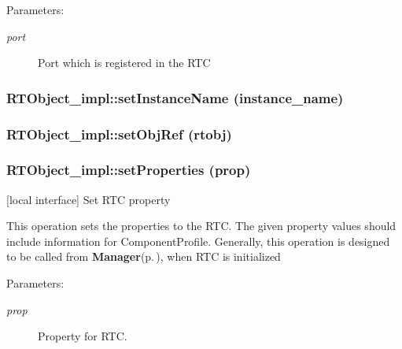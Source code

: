\begin{Desc}
\item[Parameters:]
\begin{description}
\item[{\em port}]Port which is registered in the RTC\end{description}
\end{Desc}
\subsubsection{\setlength{\rightskip}{0pt plus 5cm}RTObject\_\-impl::set\-Instance\-Name (instance\_\-name)}\label{classRTObject__impl_RTObject__impla49}


\subsubsection{\setlength{\rightskip}{0pt plus 5cm}RTObject\_\-impl::set\-Obj\-Ref (rtobj)}\label{classRTObject__impl_RTObject__impla56}


\subsubsection{\setlength{\rightskip}{0pt plus 5cm}RTObject\_\-impl::set\-Properties (prop)}\label{classRTObject__impl_RTObject__impla58}


[local interface] Set RTC property 

This operation sets the properties to the RTC. The given property values should include information for Component\-Profile. Generally, this operation is designed to be called from {\bf Manager}{\rm (p.\,\pageref{classManager})}, when RTC is initialized

\begin{Desc}
\item[Parameters:]
\begin{description}
\item[{\em prop}]Property for RTC.\end{description}
\end{Desc}
